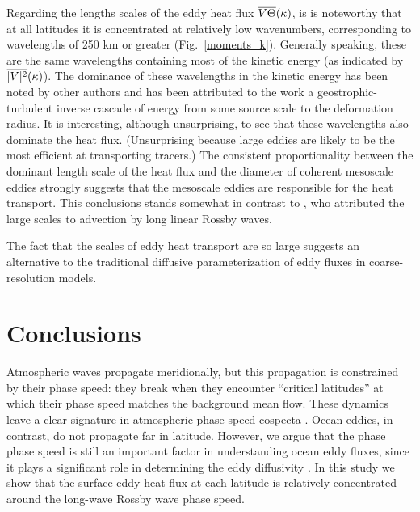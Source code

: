 \documentclass[10pt]{article}
\newcommand{\ol}{\ensuremath{\overline}}
\begin{document}
Regarding the lengths scales of the eddy heat flux $\ol{V\Theta}(\kappa)$, is is noteworthy that at all latitudes it is concentrated at relatively low wavenumbers, corresponding to wavelengths of 250 km or greater (Fig.~\ref{moments_k}). Generally speaking, these are the same wavelengths containing most of the kinetic energy (as indicated by $\ol{|V|^2}(\kappa)$). The dominance of these wavelengths in the kinetic energy has been noted by other authors \citep[e.g.][]{Stammer1997,Wunsch2010} and has been attributed to the work a geostrophic-turbulent inverse cascade of energy from some source scale to the deformation radius. It is interesting, although unsurprising, to see that these wavelengths also dominate the heat flux. (Unsurprising because large eddies are likely to be the most efficient at transporting tracers.) The consistent proportionality between the dominant length scale of the heat flux and the diameter of coherent mesoscale eddies strongly suggests that the mesoscale eddies are responsible for the heat transport. This conclusions stands somewhat in contrast to \citet{KillworthEtAl2004}, who attributed the large scales to advection by long linear Rossby waves.


The fact that the scales of eddy heat transport are so large suggests an alternative to the traditional diffusive parameterization of eddy fluxes in coarse-resolution models. 


\citet{KeatingSmith}

\section{Conclusions}
Atmospheric waves propagate meridionally, but this propagation is constrained by their phase speed: they break when they encounter ``critical latitudes'' at which their phase speed matches the background mean flow. These dynamics leave a clear signature in atmospheric phase-speed cospecta \citep{ChenHeld2007}. Ocean eddies, in contrast, do not propagate far in latitude. However, we argue that the phase phase speed is still an important factor in understanding ocean eddy fluxes, since it plays a significant role in determining the eddy diffusivity \citep{AbernatheyEtAl2010,FerrariNikurashin2010}. In this study we show that the surface eddy heat flux at each latitude is relatively concentrated around the long-wave Rossby wave phase speed.


\end{document}
